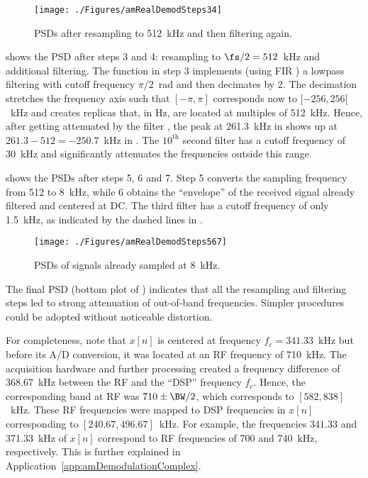 \begin{figure}[htbp]
\centering
\texttt{[image: ./Figures/amRealDemodSteps34]}
\caption{PSDs after resampling to 512~kHz and then filtering again.\label{fig:amRealDemodSteps34}}
\end{figure}

 shows the PSD after steps 3 and 4: resampling to $\fs/2=512$~kHz and additional filtering. The function  in step 3 implements (using FIR ) a lowpass filtering with cutoff frequency $\pi/2$~rad and then decimates by 2. The decimation
stretches the frequency axis such that $[-\pi,\pi]$ corresponds now to $[-256,256[$~kHz and
creates replicas that, in Hz, are located at multiples of 512~kHz. Hence, after getting attenuated
by the filter , the peak at 261.3~kHz in  shows up at $261.3-512=-250.7$~kHz in . The $10^{\textrm{th}}$ second filter has a cutoff frequency of 
 30~kHz and significantly attenuates the frequencies outside this range.

 shows the PSDs after steps 5, 6 and 7. Step 5 converts the
sampling frequency from 512 to 8~kHz, while 6 obtains the ``envelope''  of the received signal  already filtered and centered at DC. The third filter has a cutoff frequency of only 1.5~kHz,
as indicated by the dashed lines in .

\begin{figure}[htbp]
\centering
\texttt{[image: ./Figures/amRealDemodSteps567]}
\caption{PSDs of signals already sampled at 8~kHz.\label{fig:amRealDemodSteps567}}
\end{figure}

The final PSD (bottom plot of ) indicates that all the resampling
and filtering steps led to strong attenuation of out-of-band frequencies. Simpler procedures
could be adopted without noticeable distortion.

For completeness, note that $x[n]$ is centered 
	at frequency $f_c=341.33$~kHz but before its A/D conversion, it was located at an RF frequency
	 of 710~kHz.
	The acquisition hardware and further processing created a frequency difference of 
	$368.67$~kHz between the RF and the ``DSP'' frequency $f_c$.  Hence, the corresponding band at 
	RF was $710 \pm \BW/2$, which corresponds to
	$[582, 838]$~kHz. These RF frequencies were mapped to DSP frequencies in $x[n]$
	corresponding to 
	$[240.67, 496.67]$~kHz. For example, the frequencies $341.33$ and 371.33~kHz of $x[n]$ correspond to RF frequencies of 700 and 740~kHz, respectively. This is further explained
	in Application~\ref{app:amDemodulationComplex}.
\eApplication

